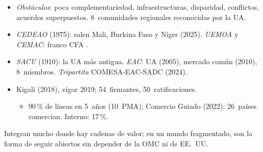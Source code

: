 \documentclass{article}
\begin{document}
\begin{columnas}
\begin{itemize}
\item \emph{Obstáculos}: poca complementariedad, infraestructuras, disparidad, conflictos, acuerdos superpuestos. 8~comunidades regionales reconocidas por la UA.
\item \emph{CEDEAO} (1975): salen Mali, Burkina Faso y Níger (2025). \emph{UEMOA} y \emph{CEMAC}: franco CFA .
\item \emph{SACU} (1910): la UA más antigua. \emph{EAC}: UA (2005), mercado común (2010), 8~miembros. \emph{Tripartita} COMESA-EAC-SADC (2024).
\end{itemize}
\begin{itemize}
\item Kigali (2018), vigor 2019; 54~firmantes, 50~ratificaciones.
  \begin{itemize}
  \item 90\,\% de líneas en 5~años (10~PMA); Comercio Guiado (2022): 26~países comercian. Interno: 17\,\%.
  \end{itemize}
\end{itemize}

\begin{ideaclave}
Integran mucho donde hay cadenas de valor; en un mundo fragmentado, son la forma de seguir abiertos sin depender de la OMC ni de EE.~UU.
\end{ideaclave}


\end{columnas}
\end{document}
